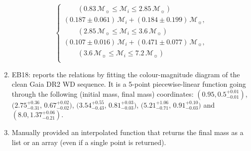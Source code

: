 \documentclass[fleqn,usenatbib]{rasti}
\newcommand{\msun}{\mathcal{M}_{\sun}}
\begin{document}
\begin{enumerate}
\begin{equation}
\begin{cases}
                  \qquad(0.83\,\msun \leq \mathcal{M}_i \leq 2.85\,\msun)\\
                  (0.187 \pm 0.061)\,\mathcal{M}_i + (0.184 \pm 0.199)\,\msun,\\
                  \qquad(2.85\,\msun \leq \mathcal{M}_i \leq 3.6\,\msun)\\
                  (0.107 \pm 0.016)\,\mathcal{M}_i + (0.471 \pm 0.077)\,\msun,\\
                  \qquad(3.6\,\msun \leq \mathcal{M}_i \leq 7.2\,\msun)\\
              \end{cases}
    \end{equation}
    \item EB18: \citet{2018ApJ...860L..17E} reports the relations by fitting the colour-magnitude diagram of the clean Gaia DR2 WD sequence. It is a 5-point piecewise-linear function going through the following (initial mass, final mass) coordinates: $(0.95, 0.5^{+0.01}_{-0.01})$, $(2.75^{+0.36}_{-0.31}$, $0.67^{+0.02}_{-0.02})$, $(3.54^{+0.55}_{-0.43}$, $0.81^{+0.03}_{-0.03})$, $(5.21^{+1.06}_{-0.71}$, $0.91^{+0.10}_{-0.03})$ and $(8.0, 1.37^{+0.06}_{-0.21})$.
    \item Manually provided an interpolated function that returns the final mass as a list or an array (even if a single point is returned).
\end{enumerate}
\end{document}
